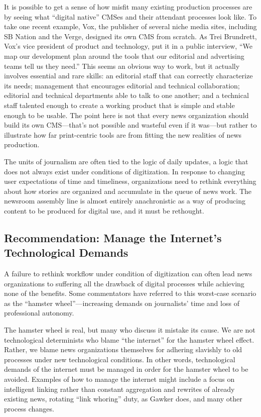 It is possible to get a sense of how misfit many existing production processes
are by seeing what ``digital native'' CMSes and their attendant processes look
like. To take one recent example, Vox, the publisher of several niche media sites,
including SB Nation and the Verge, designed its own CMS from scratch. As
Trei Brundrett, Vox’s vice president of product and technology, put it in a public
interview, ``We map our development plan around the tools that our editorial
and advertising teams tell us they need.'' This seems an obvious way to work,
but it actually involves essential and rare skills: an editorial staff that can correctly characterize its needs; management that encourages editorial and technical collaboration;
editorial and technical departments able to talk to one another; and
a technical staff talented enough to create a working product that is simple and
stable enough to be usable. The point here is not that every news organization
should build its own CMS—that’s not possible and wasteful even if it was—but
rather to illustrate how far print-centric tools are from fitting the new realities
of news production.

The units of journalism are often tied to the logic of daily updates, a logic that
does not always exist under conditions of digitization. In response to changing
user expectations of time and timeliness, organizations need to rethink everything
about how stories are organized and accumulate in the queue of news
work. The newsroom assembly line is almost entirely anachronistic as a way of
producing content to be produced for digital use, and it must be rethought.

\subsection{Recommendation: Manage the Internet’s Technological Demands}
A failure to rethink workflow under condition of digitization can often
lead news organizations to suffering all the drawback of digital processes
while achieving none of the benefits. Some commentators have
referred to this worst-case scenario as the ``hamster wheel''—increasing
demands on journalists’ time and loss of professional autonomy.

The hamster wheel is real, but many who discuss it mistake its cause.
We are not technological determinists who blame ``the internet'' for
the hamster wheel effect. Rather, we blame news organizations themselves
for adhering slavishly to old processes under new technological
conditions. In other words, technological demands of the internet
must be managed in order for the hamster wheel to be avoided. Examples
of how to manage the internet might include a focus on intelligent
linking rather than constant aggregation and rewrites of already
existing news, rotating ``link whoring'' duty, as Gawker does, and many
other process changes.


